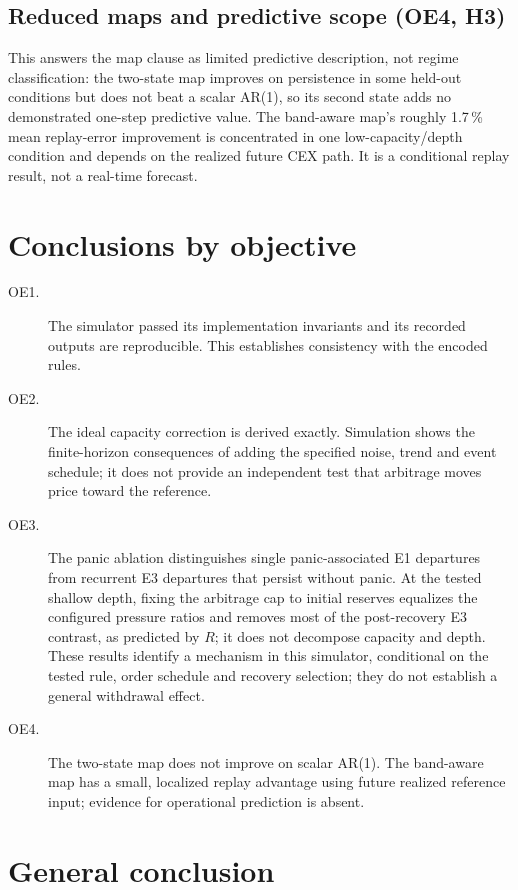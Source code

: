 \subsection{Reduced maps and predictive scope (OE4, H3)}

This answers the map clause as limited predictive description, not regime classification: the two-state map improves on persistence in some held-out conditions but does not beat a scalar AR(1), so its second state adds no demonstrated one-step predictive value. The band-aware map's roughly 1.7\,\% mean replay-error improvement is concentrated in one low-capacity/depth condition and depends on the realized future CEX path. It is a conditional replay result, not a real-time forecast.

\section{Conclusions by objective}

\begin{description}
  \item[OE1.] The simulator passed its implementation invariants and its recorded outputs are reproducible. This establishes consistency with the encoded rules.
  \item[OE2.] The ideal capacity correction is derived exactly. Simulation shows the finite-horizon consequences of adding the specified noise, trend and event schedule; it does not provide an independent test that arbitrage moves price toward the reference.
  \item[OE3.] The panic ablation distinguishes single panic-associated E1 departures from recurrent E3 departures that persist without panic. At the tested shallow depth, fixing the arbitrage cap to initial reserves equalizes the configured pressure ratios and removes most of the post-recovery E3 contrast, as predicted by $R$; it does not decompose capacity and depth. These results identify a mechanism in this simulator, conditional on the tested rule, order schedule and recovery selection; they do not establish a general withdrawal effect.
  \item[OE4.] The two-state map does not improve on scalar AR(1). The band-aware map has a small, localized replay advantage using future realized reference input; evidence for operational prediction is absent.
\end{description}

\section{General conclusion}

